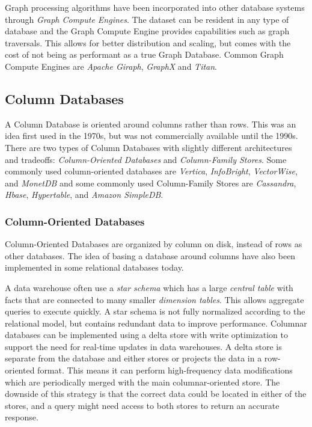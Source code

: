 Graph processing algorithms have been incorporated into other database systems through \emph{Graph Compute Engines}. The dataset can be resident in any type of database and the Graph Compute Engine provides capabilities such as graph traversals. This allows for better distribution and scaling, but comes with the cost of not being as performant as a true Graph Database. Common Graph Compute Engines are \emph{Apache Giraph}, \emph{GraphX} and \emph{Titan}.

\subsection{Column Databases}
\label{intro-col-db}

A Column Database is oriented around columns rather than rows. This was an idea first used in the 1970s, but was not commercially available until the 1990s.
There are two types of Column Databases with slightly different architectures and tradeoffs: \emph{Column-Oriented Databases} and \emph{Column-Family Stores}.
Some commonly used column-oriented databases are \emph{Vertica}, \emph{InfoBright}, \emph{VectorWise}, and \emph{MonetDB} and some commonly used Column-Family Stores are \emph{Cassandra}, \emph{Hbase}, \emph{Hypertable}, and \emph{Amazon SimpleDB}.

\subsubsection{Column-Oriented Databases}

Column-Oriented Databases are organized by column on disk, instead of rows as other databases.
The idea of basing a database around columns have also been implemented in some relational databases today.

A data warehouse often use a \emph{star schema} which has a large \emph{central table} with facts that are connected to many smaller \emph{dimension tables}. This allows aggregate queries to execute quickly. A star schema is not fully normalized according to the relational model, but contains redundant data to improve performance.
Columnar databases can be implemented using a delta store with write optimization to support the need for real-time updates in data warehouses. A delta store is separate from the database and either stores or projects the data in a row-oriented format. This means it can perform high-frequency data modifications which are periodically merged with the main columnar-oriented store. The downside of this strategy is that the correct data could be located in either of the stores, and a query might need access to both stores to return an accurate response.


